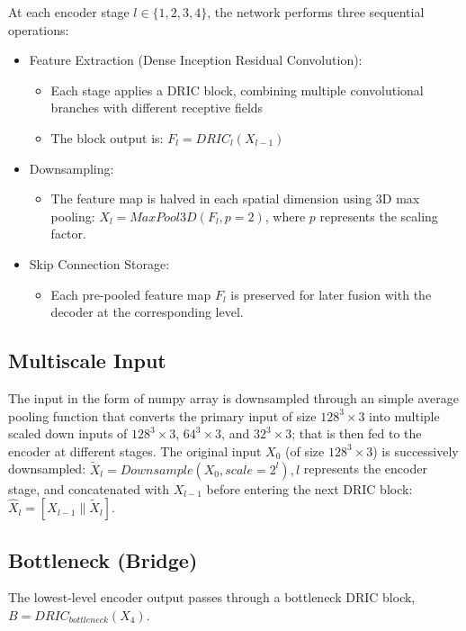 At each encoder stage $l\in\{1,2,3,4\}$, the network performs three sequential operations:
\begin{itemize}
    \item Feature Extraction (Dense Inception Residual Convolution):
    \begin{itemize}
        \item Each stage applies a DRIC block, combining multiple convolutional branches with different receptive fields
        \item The block output is: $F_l = DRIC_l (X_{l-1})$
    \end{itemize}
    \item Downsampling:
    \begin{itemize}
        \item {\sloppy The feature map is halved in each spatial dimension using 3D max pooling: $X_l = MaxPool3D(F_l, p = 2)$, where $p$ represents the scaling factor.\par}
    \end{itemize}
    \item Skip Connection Storage:
    \begin{itemize}
        \item Each pre-pooled feature map $F_l$ is preserved for later fusion with the decoder at the corresponding level.
    \end{itemize}
\end{itemize}

\subsection{Multiscale Input}

The input in the form of numpy array is downsampled through an simple average pooling function that converts the primary input of size $128^3\times3$ into multiple scaled down inputs of $128^3\times3$, $64^3\times3$, and $32^3\times3$; that is then fed to the encoder at different stages.
The original input $X_0$ (of size $128^3\times3$) is successively downsampled:
$\tilde{X}_l=Downsample(X_0,scale=2^l), l$ represents the encoder stage, and concatenated with $X_{l-1}$ before entering the next DRIC block:
$\hat{X}_l=[X_{l-1} \| \tilde{X}_l]$.

\subsection{Bottleneck (Bridge)}

The lowest-level encoder output passes through a bottleneck DRIC block, $B = DRIC_{bottleneck}(X_4)$.

